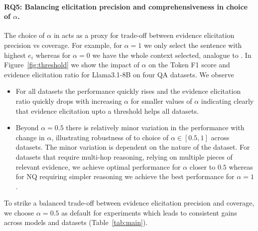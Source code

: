 \paragraph{RQ5: Balancing elicitation precision and comprehensiveness in choice of $\alpha$.}
The choice of $\alpha$ in \se acts as a proxy for trade-off between evidence elicitation precision vs coverage. For example, for $\alpha=1$ we only select the sentence with highest $e_i$ whereas for $\alpha=0$ we have the whole context selected, analogue to \fe. In Figure~\ref{fig:threshold} we show the impact of $\alpha$ on the Token F1 score and evidence elicitation ratio for Llama3.1-8B on four QA datasets. We observe
\begin{itemize}
    \item For all datasets the performance quickly rises and the evidence elicitation ratio quickly drops with increasing $\alpha$ for smaller values of $\alpha$ indicating clearly that evidence elicitation upto a threshold helps all datasets. 
    \item Beyond $\alpha=0.5$ there is relatively minor variation in the performance with change in $\alpha$, illustrating robustness of \se to choice of $\alpha \in [0.5, 1]$ across datasets. The minor variation is dependent on the nature of the dataset. For datasets that require multi-hop reasoning, relying on multiple pieces of relevant evidence, we achieve optimal performance for $\alpha$ closer to $0.5$ whereas for NQ requiring simpler reasoning we achieve the best performance for $\alpha=1$. 
\end{itemize}
To strike a balanced trade-off between evidence elicitation precision and coverage, we choose $\alpha=0.5$ as default for experiments which leads to consistent gains across models and datasets (Table~\ref{tab:main}).